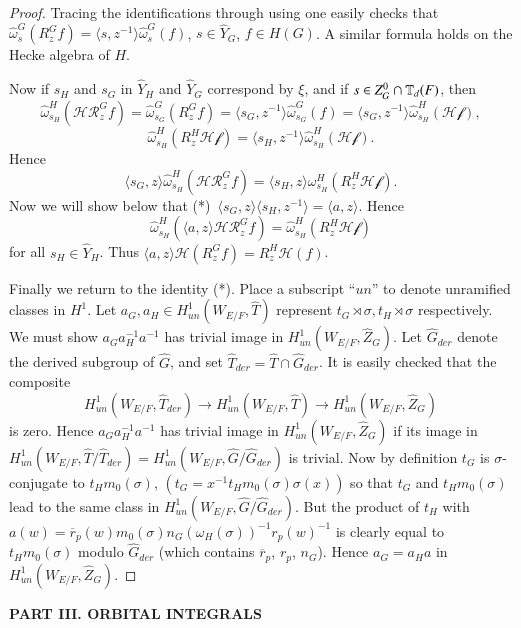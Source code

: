\documentclass[11pt]{amsart}
\theoremstyle{plain}
\theoremstyle{definition}
\def\what#1{\widehat#1}
\def\MACDONALD{23}
\begin{document}
\begin{proof}
Tracing the identifications through using \cite{\MACDONALD}
one easily checks that $\what\omega_s^G(R_z^Gf) = \langle s,z^{-1}\rangle
\what\omega_s^G(f)$, $s\in \what Y_G$, $f\in H(G)$.  A similar
formula holds on the Hecke algebra of $H$.

Now if $s_H$ and $s_G$ in $\what Y_H$ and $\what Y_G$ correspond
by $\xi$, and if $s\in Z_G^0\cap \Bbb T_d(F)$, then
$$\what\omega^H_{s_H}(\mathcal{ HR}_z^Gf) = 
  \what\omega_{s_G}^G(R_z^Gf) = \langle s_G,z^{-1}\rangle \what\omega^G_{s_G}(f) =
  \langle s_G,z^{-1}\rangle \what\omega_{s_H}^H(\mathcal{ Hf}),$$
$$\what\omega_{s_H}^H(R_z^H\mathcal{ Hf}) = \langle s_H,z^{-1}\rangle
	\what\omega_{s_H}^H(\mathcal{ Hf}).$$
Hence
$$\langle s_G,z\rangle\what\omega_{s_H}^H(\mathcal{ HR}_z^Gf) =
	\langle s_H,z\rangle \omega_{s_H}^H(R_z^H\mathcal{ Hf}).$$
Now we will show below that (*)\ $\langle s_G,z\rangle\langle s_H,z^{-1}\rangle
	= \langle a,z\rangle$.
Hence 
$$\what\omega_{s_H}^H(\langle a,z\rangle \mathcal{ HR}_z^Gf) = 
	\what\omega^H_{s_H}(R_z^H\mathcal{ Hf})$$
for all $s_H\in \what Y_H$.  Thus $\langle a,z\rangle \mathcal{ H}(R^G_zf)
	=R_z^H\mathcal{ H}(f)$.

Finally we return to the identity (*).  Place a subscript ``$un$''
to denote unramified classes in $H^1$.
Let $a_G,a_H\in H^1_{un}(W_{E/F},\what T)$ represent $t_G\rtimes\sigma,
t_H\rtimes\sigma$ respectively.  We must show $a_Ga_H^{-1}a^{-1}$
has trivial image in $H^1_{un}(W_{E/F},\what Z_G)$.  Let $\what G_{der}$ denote
the derived subgroup of $\what G$, and set $\what T_{der} = \what T\cap
\what G_{der}$.  It is easily checked that the composite
$$H^1_{un}(W_{E/F},\what T_{der}) \to H^1_{un}(W_{E/F},\what T) \to
  H^1_{un}(W_{E/F},\what Z_G)$$
is zero.  Hence $a_Ga_H^{-1}a^{-1}$ has trivial image in $H^1_{un}(W_{E/F},\what Z_G)$
if its image in $H^1_{un}(W_{E/F},\what T/\what T_{der}) =
H^1_{un}(W_{E/F},\what G/\what G_{der})$ is trivial.
Now by definition $t_G$ is $\sigma$-conjugate to $t_Hm_0(\sigma)$,
$(t_G = x^{-1}t_Hm_0(\sigma)\sigma(x))$ so that $t_G$ and $t_Hm_0(\sigma)$
lead to the same class in $H^1_{un}(W_{E/F},\what G/\what G_{der})$.
But the product of $t_H$ with $a(w) = \overline r_p(w) m_0(\sigma) 
n_G(\omega_H(\sigma))^{-1} r_p(w)^{-1}$ is clearly equal to
$t_Hm_0(\sigma)$ modulo $\what G_{der}$ (which contains $\overline r_p$,
$r_p$, $n_G$).  Hence $a_G = a_Ha$ in $H^1_{un}(W_{E/F},\what Z_G)$.
\end{proof}

\vfil\eject
\centerline{\bf PART III.  ORBITAL INTEGRALS}\vskip3pc
\end{document}
